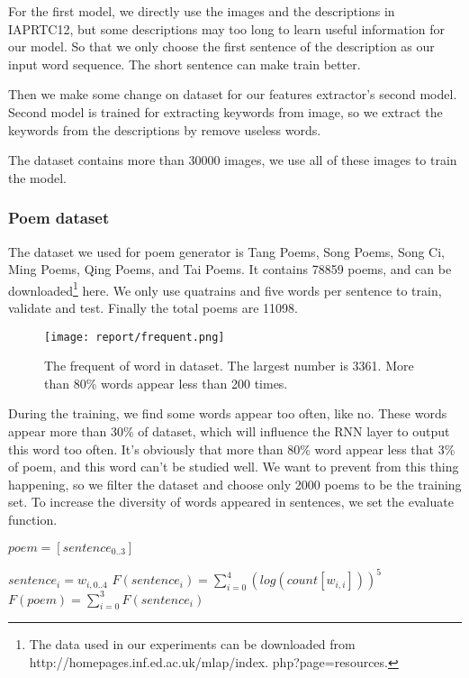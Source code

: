 \documentclass[10pt,twocolumn,letterpaper]{article}
\begin{document}
For the first model, we directly use the images and the descriptions in IAPRTC12, but some descriptions may too long to learn useful information for our model. So that we only choose the first sentence of the description as our input word sequence. The short sentence can make train better.

Then we make some change on dataset for our features extractor's second model. Second model is trained for extracting keywords from image, so we extract the keywords from the descriptions by remove useless words.

The dataset contains more than 30000 images, we use all of these images to train the model.

\subsubsection{Poem dataset}
The dataset we used for poem generator is Tang Poems, Song Poems, Song Ci, Ming Poems, Qing Poems, and Tai Poems. It contains 78859 poems, and can be downloaded\footnote{The data used in our experiments can be downloaded from http://homepages.inf.ed.ac.uk/mlap/index. php?page=resources.} here. We only use quatrains and five words per sentence to train, validate and test. Finally the total poems are 11098.

\begin{figure}[t]
\begin{center}
   \texttt{[image: report/frequent.png]}
\end{center}
   \caption{The frequent of word in dataset. The largest number is 3361. More than 80\% words appear less than 200 times.}
\label{fig:frequent}
\end{figure}

During the training, we find some words appear too often, like no. These words appear more than 30\% of dataset, which will influence the RNN layer to output this word too often. It's obviously that more than 80\% word appear less that 3\% of poem, and this word can't be studied well. We want to prevent from this thing happening, so we filter the dataset and choose only 2000 poems to be the training set. To increase the diversity of words appeared in sentences, we set the evaluate function.
\begin{center}
    $poem=[sentence_{0..3}]$

    $sentence_{i}=w_{i, 0..4}$
    $F(sentence_{i}) = \sum_{i=0}^{4}(log(count[w_{i, i}]))^5$
    $F(poem)=\sum_{i=0}^{3}{F(sentence_{i})}$
\end{center}
\end{document}
